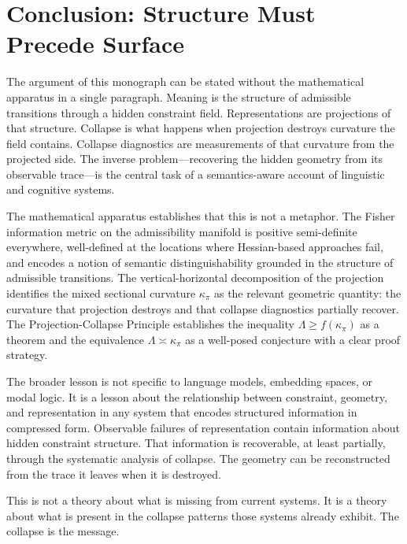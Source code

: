 \documentclass[12pt, oneside]{book}
\theoremstyle{plain-flyxion}
\theoremstyle{definition-flyxion}
\newcommand{\kpi}{\kappa_{\pi}}
\newcommand{\Lam}{\Lambda}
\begin{document}
\chapter*{Conclusion: Structure Must Precede Surface}

The argument of this monograph can be stated without the mathematical apparatus in a
single paragraph. Meaning is the structure of admissible transitions through a hidden
constraint field. Representations are projections of that structure. Collapse is what
happens when projection destroys curvature the field contains. Collapse diagnostics are
measurements of that curvature from the projected side. The inverse problem---recovering
the hidden geometry from its observable trace---is the central task of a semantics-aware
account of linguistic and cognitive systems.

The mathematical apparatus establishes that this is not a metaphor. The Fisher information
metric on the admissibility manifold is positive semi-definite everywhere, well-defined at
the locations where Hessian-based approaches fail, and encodes a notion of semantic
distinguishability grounded in the structure of admissible transitions. The
vertical-horizontal decomposition of the projection identifies the mixed sectional
curvature $\kpi$ as the relevant geometric quantity: the curvature that projection
destroys and that collapse diagnostics partially recover. The Projection-Collapse Principle
establishes the inequality $\Lam\geq f(\kpi)$ as a theorem and the equivalence
$\Lam\asymp\kpi$ as a well-posed conjecture with a clear proof strategy.

The broader lesson is not specific to language models, embedding spaces, or modal logic.
It is a lesson about the relationship between constraint, geometry, and representation in
any system that encodes structured information in compressed form. Observable failures of
representation contain information about hidden constraint structure. That information is
recoverable, at least partially, through the systematic analysis of collapse. The
geometry can be reconstructed from the trace it leaves when it is destroyed.

This is not a theory about what is missing from current systems. It is a theory about
what is present in the collapse patterns those systems already exhibit. The collapse is
the message.

\appendix
\end{document}
